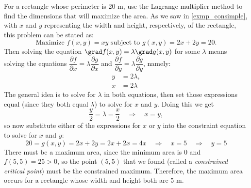 \begin{example}\label{exmp_rectlm}
For a rectangle whose perimeter is $20$ m, use the Lagrange multiplier method to find the dimensions that will maximize the area.
\solution
As we saw in \autoref{exmp_consimple}, with $x$ and $y$ representing the width and height, respectively, of the rectangle, this problem can be stated as:
 \[\text{Maximize }f(x,y) = xy\text{ subject to }g(x,y) = 2x + 2y = 20.\]
 Then solving the equation $\grad f(x,y) = \lambda \grad g(x,y)$ for some $\lambda$ means solving the equations $\dfrac{\partial f}{\partial x} = \lambda \dfrac{\partial g}{\partial x}$ and $\dfrac{\partial f}{\partial y} = \lambda \dfrac{\partial g}{\partial y}$, namely:
 \begin{align*}
  y &= 2\lambda ,\\
  x &= 2\lambda
 \end{align*}
 The general idea is to solve for $\lambda$ in both equations, then set those expressions equal (since they both equal $\lambda$) to solve for $x$ and $y$. Doing this we get
 \[\frac y2 = \lambda = \frac x2 \quad \Rightarrow \quad x = y ,\]
 so now substitute either of the expressions for $x$ or $y$ into the constraint equation to solve for $x$ and $y$:
 \[20=g(x,y)=2x+2y=2x+2x=4x\quad\Rightarrow\quad x=5\quad\Rightarrow\quad y=5\]
 There must be a maximum area, since the minimum area is $0$ and $f(5,5) = 25 > 0$, so the point $(5,5)$ that we found (called a \emph{constrained critical point}) must be the constrained maximum. Therefore, the maximum area occurs for a rectangle whose width and height both are $5$ m.
\end{example}

